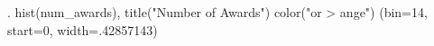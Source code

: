 . hist(num_awards), title("Number of Awards") color("or
> ange")
(bin=14, start=0, width=.42857143)
{\smallskip}

